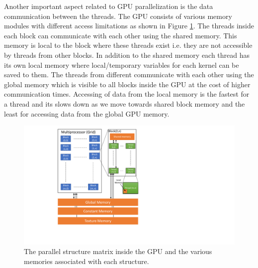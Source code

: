 \documentclass[preprint,10pt,authoryear,review]{elsarticle}
\begin{document}
\begin{linenumbers}
Another important aspect related to GPU parallelization is the data communication between the threads. 
The GPU consists of various memory modules with different access limitations as shown in Figure 
\ref{fig:bkg_gpu_arch}. The threads inside each block can communicate with each other using the 
shared memory. This memory is local to the block where these threads exist i.e. they are not 
accessible by threads from other blocks. In addition to the shared memory each thread has its 
own local memory where local/temporary variables for each kernel can be saved to them. 
The threads from different communicate with each other using the global memory which is visible to 
all blocks inside the GPU at the cost of higher communication times. Accessing of data from the 
local memory is the fastest for a thread and its slows down as we move towards shared block memory 
and the least for accessing data from the global GPU memory. 


\begin{figure}[h]
\centering
\includegraphics[scale=0.75]{gpu_arch_new.pdf}
\caption{The parallel structure matrix inside the GPU and the various memories associated 
with each structure.}
\label{fig:bkg_gpu_arch}
\end{figure}



\end{linenumbers}
\end{document}

